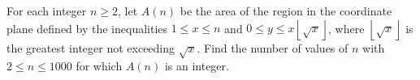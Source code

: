 For each integer $n \ge 2$,  let $A(n)$ be the area of the region in the coordinate plane defined by the inequalities $1\le x \le n$ and $0\le y \le x \left\lfloor \sqrt x \right\rfloor$,  where $\left\lfloor \sqrt x \right\rfloor$ is the greatest integer not exceeding $\sqrt x$. Find the number of values of $n$ with $2\le n \le 1000$ for which $A(n)$ is an integer.